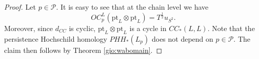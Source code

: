 \begin{proof}
	Let $p\in \mathcal{P}$. It is easy to see
	that at the chain level we have $$OC_p^L(\text{pt}_L\otimes \text{pt}_L) = T^{\frac{1}{2}}u_{S^2}.$$ Moreover, since $d_{CC}$ is cyclic, $\text{pt}_L\otimes \text{pt}_L$ is a cycle in $CC_*(L,L)$. Note that the persistence Hochschild homology $PHH_*(L_p)$ does not depend on $p\in \mathcal{P}$. The claim then follows by Theorem \ref{gio:wabomain}.
\end{proof}
